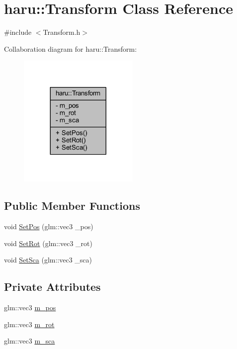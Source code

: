 \hypertarget{classharu_1_1_transform}{}\section{haru\+:\+:Transform Class Reference}
\label{classharu_1_1_transform}


{\ttfamily \#include $<$Transform.\+h$>$}



Collaboration diagram for haru\+:\+:Transform\+:\nopagebreak
\begin{figure}[H]
\begin{center}
\leavevmode
\includegraphics[width=164pt]{classharu_1_1_transform__coll__graph}
\end{center}
\end{figure}
\subsection*{Public Member Functions}
\begin{DoxyCompactItemize}
\item 
void \mbox{\hyperlink{classharu_1_1_transform_a6fd0db91da93d5e88ae6c71559563823}{Set\+Pos}} (glm\+::vec3 \+\_\+pos)
\item 
void \mbox{\hyperlink{classharu_1_1_transform_a8c27baa1c0c35b0a9bd8e1e60f158262}{Set\+Rot}} (glm\+::vec3 \+\_\+rot)
\item 
void \mbox{\hyperlink{classharu_1_1_transform_a16f09008ba3b2effca7f1004caa61ef3}{Set\+Sca}} (glm\+::vec3 \+\_\+sca)
\end{DoxyCompactItemize}
\subsection*{Private Attributes}
\begin{DoxyCompactItemize}
\item 
glm\+::vec3 \mbox{\hyperlink{classharu_1_1_transform_a35eaba7475c13b6ad5925d112e4970ac}{m\+\_\+pos}}
\item 
glm\+::vec3 \mbox{\hyperlink{classharu_1_1_transform_af4ed94d05315ca5235e8a7ee7dd11990}{m\+\_\+rot}}
\item 
glm\+::vec3 \mbox{\hyperlink{classharu_1_1_transform_a1bba1e129d40a560ac0615b8e2de0d6e}{m\+\_\+sca}}
\end{DoxyCompactItemize}


